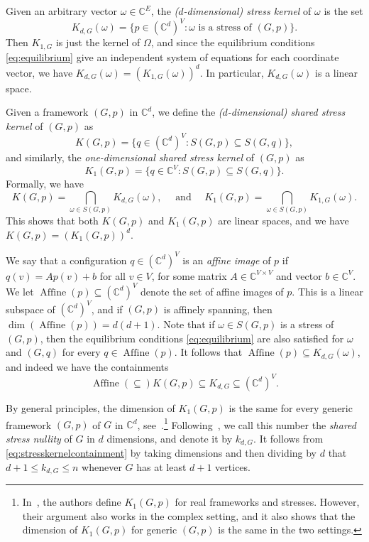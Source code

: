 \documentclass[11pt,a4paper,dvipsnames]{scrartcl}
\theoremstyle{definition}
\newcommand{\CC}{\mathbb{C}}
\newcommand{\stressnullity}[1]{k_{d, #1}}
\newcommand{\stresskernel}[2]{K_{{#1},{#2}}}
\newcommand{\sharedstresskernel}[1]{K}
\DeclareMathOperator{\aff}{Affine}
\newcommand{\affine}[2]{\aff(#2)}
\begin{document}
Given an arbitrary vector $\omega \in \CC^E$, the \emph{($d$-dimensional) stress kernel} of $\omega$ is the set \[\stresskernel{d}{G}(\omega) = \{p \in (\CC^{d})^V: \omega \text{ is a stress of } (G,p)\}.\] Then $\stresskernel{1}{G}$ is just the kernel of $\Omega$, and since the equilibrium conditions \cref{eq:equilibrium} give an independent system of equations for each coordinate vector, we have $\stresskernel{d}{G}(\omega) = {(\stresskernel{1}{G}(\omega))}^d$. In particular, $\stresskernel{d}{G}(\omega)$ is a linear space. 

Given a framework $(G,p)$ in $\CC^d$, we define the \emph{($d$-dimensional) shared stress kernel} of $(G,p)$ as
\[\sharedstresskernel{d}(G,p) = \{q \in (\CC^d)^V : S(G,p) \subseteq S(G,q)\},\] and similarly, the \emph{one-dimensional shared stress kernel} of $(G,p)$ as
\[K_1(G,p) = \{q \in \CC^V : S(G,p) \subseteq S(G,q)\}.\] 
Formally, we have
\[ \sharedstresskernel{d}(G,p) = \bigcap_{\omega \in S(G,p)} \stresskernel{d}{G}(\omega), \hspace{1em} \text{ and } \hspace{1em} K_1(G,p) = \bigcap_{\omega \in S(G,p)} \stresskernel{1}{G}(\omega).\]
This shows that both $\sharedstresskernel{d}(G,p)$ and $K_1(G,p)$ are linear spaces, and we have $\sharedstresskernel{d}(G,p) = {(K_1(G,p))}^d$.

We say that a configuration $q \in (\CC^d)^V$ is an \emph{affine image} of $p$ if $q(v) = Ap(v) + b$ for all $v \in V$, for some matrix $A \in \CC^{V \times V}$ and vector $b \in \CC^V$. We let $\affine{G}{p} \subseteq (\CC^d)^V$ denote the set of affine images of $p$. This is a linear subspace of $(\CC^d)^V$, and if $(G,p)$ is affinely spanning, then $\dim(\affine{G}{p}) = d(d+1)$. Note that if $\omega \in S(G,p)$ is a stress of $(G,p)$, then the equilibrium conditions \cref{eq:equilibrium} are also satisfied for $\omega$ and $(G,q)$ for every $q \in \affine{G}{p}$. It follows that $\affine{G}{p} \subseteq \stresskernel{d}{G}(\omega)$, and indeed we have the containments 
\begin{equation}\label{eq:stresskernelcontainment}
    \affine{G,p} \subseteq \sharedstresskernel{d}(G,p) \subseteq \stresskernel{d}{G} \subseteq (\CC^d)^V.
\end{equation}

By general principles, the dimension of $K_1(G,p)$ is the same for every generic framework $(G,p)$ of $G$ in $\CC^d$, see~\cite[Remark 4.2]{gortler.etal_2010}.\footnote{In~\cite{gortler.etal_2010}, the authors define $K_1(G,p)$ for real frameworks and stresses. However, their argument also works in the complex setting, and it also shows that the dimension of $K_1(G,p)$ for generic $(G,p)$ is the same in the two settings.} Following~\cite{gortler.etal_2010}, we call this number the \emph{shared stress nullity} of $G$ in $d$ dimensions, and denote it by $\stressnullity{G}$. It follows from \cref{eq:stresskernelcontainment} by taking dimensions and then dividing by $d$ that $d+1 \leq \stressnullity{G} \leq n$ whenever $G$ has at least $d+1$ vertices. 
\end{document}
